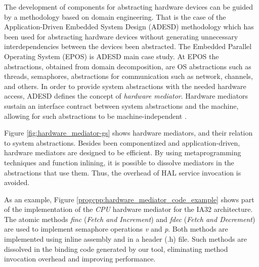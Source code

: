 The development of components for abstracting hardware devices can be guided by
a methodology based on domain engineering.
That is the case of the Application-Driven Embedded System Design (ADESD)
methodology \cite{Froehlich:2001} which has been used
for abstracting hardware devices without
generating unnecessary interdependencies between the devices been abstracted.
The Embedded Parallel Operating System (EPOS) is ADESD main case study.
At EPOS the abstractions, obtained from domain decomposition, are OS abstractions
such as threads, semaphores, abstractions for communication such as network,
channels, and others.
In order to provide system abstractions with the needed hardware access, ADESD
defines the concept of \emph{hardware mediator}.
Hardware mediators sustain an interface contract between system abstractions and
the machine, allowing for such abstractions to be machine-independent \cite{Polpeta:2004}.
% 
% 

Figure \ref{fig:hardware_mediator-gs} shows hardware mediators, and their
relation to system abstractions.
Besides been componentized and application-driven, hardware mediators are
designed to be efficient.
By using metaprogramming techniques and function inlining, it is possible to
dissolve mediators in the abstractions that use them.
Thus, the overhead of HAL service invocation is avoided.


As an example, Figure \ref{progcpp:hardware_mediator_code_example} shows part of the
implementation of the \emph{CPU} hardware mediator for the IA32 architecture.
The atomic methods
\emph{finc} (\emph{Fetch and Increment}) and
\emph{fdec} (\emph{Fetch and Decrement}) are used to implement semaphore
operations \emph{v} and \emph{p}.
Both methods are implemented using inline assembly and in a header (.h) file.
Such methods are dissolved in the binding code generated by our tool,
eliminating method invocation overhead and improving performance.


